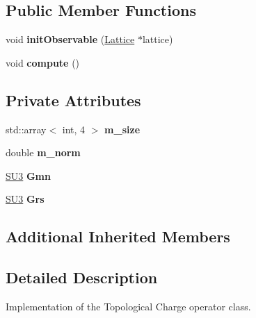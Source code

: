\subsection*{Public Member Functions}
\begin{DoxyCompactItemize}
\item 
void {\bfseries init\+Observable} (\hyperlink{classLattice}{Lattice} $\ast$lattice)\hypertarget{classTopologicalCharge_a3738265d7e456997ba0ff57bcba55188}{}\label{classTopologicalCharge_a3738265d7e456997ba0ff57bcba55188}

\item 
void {\bfseries compute} ()\hypertarget{classTopologicalCharge_a67b19b74c8c4f981d37490623ca774f2}{}\label{classTopologicalCharge_a67b19b74c8c4f981d37490623ca774f2}

\end{DoxyCompactItemize}
\subsection*{Private Attributes}
\begin{DoxyCompactItemize}
\item 
std\+::array$<$ int, 4 $>$ {\bfseries m\+\_\+size}\hypertarget{classTopologicalCharge_a7c710f7c182d1255533438fb343cf8ee}{}\label{classTopologicalCharge_a7c710f7c182d1255533438fb343cf8ee}

\item 
double {\bfseries m\+\_\+norm}\hypertarget{classTopologicalCharge_a35210a65883371d53d0eecbf90ef3ffd}{}\label{classTopologicalCharge_a35210a65883371d53d0eecbf90ef3ffd}

\item 
\hyperlink{structSU3}{S\+U3} {\bfseries Gmn}\hypertarget{classTopologicalCharge_a428ef097640a91fe39c3b2936cd64ad0}{}\label{classTopologicalCharge_a428ef097640a91fe39c3b2936cd64ad0}

\item 
\hyperlink{structSU3}{S\+U3} {\bfseries Grs}\hypertarget{classTopologicalCharge_a65cd1f2ba971ec5e92b60188b94b1a33}{}\label{classTopologicalCharge_a65cd1f2ba971ec5e92b60188b94b1a33}

\end{DoxyCompactItemize}
\subsection*{Additional Inherited Members}


\subsection{Detailed Description}
Implementation of the Topological Charge operator class. 

